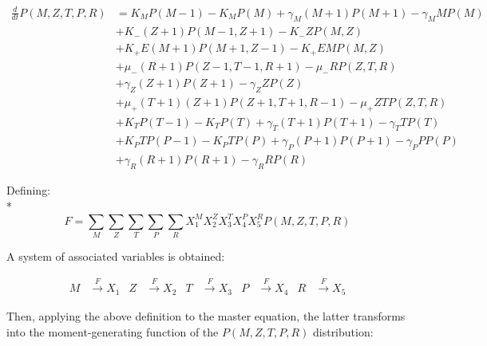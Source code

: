 \documentclass{article}
\begin{document}
\begin{align*}
    \frac{d}{dt}P(M, Z, T, P, R) &= K_MP(M-1) - K_MP(M) + \gamma_M(M+1)P(M+1) - \gamma_MMP(M)\\
                                 &+ K_-(Z+1)P(M-1,Z+1) - K_-ZP(M,Z)\\
                                 &+ K_+E(M+1)P(M+1,Z-1) - K_+EMP(M,Z)\\
                                 &+ \mu_-(R+1)P(Z-1,T-1,R+1) - \mu_-RP(Z,T,R)\\
                                 &+ \gamma_Z(Z+1)P(Z+1) - \gamma_ZZP(Z)\\
                                 &+ \mu_+(T+1)(Z+1)P(Z+1,T+1,R-1) - \mu_+ZTP(Z,T,R)\\
                                 &+ K_TP(T-1) - K_TP(T) + \gamma_T(T+1)P(T+1) - \gamma_TTP(T)\\
                                 &+ K_PTP(P-1) - K_PTP(P) + \gamma_P(P+1)P(P+1) - \gamma_PPP(P)\\
                                 &+ \gamma_R(R+1)P(R+1) - \gamma_RRP(R)
\end{align*}

Defining:
\\*
\begin{equation*}
    F = \sum_M\sum_Z\sum_T\sum_P\sum_R X_1^MX_2^ZX_3^TX_4^PX_5^RP(M,Z,T,P,R)
\end{equation*}


A system of associated variables is obtained:

\begin{align*}
    M &\xrightarrow{F} X_1 & Z&\xrightarrow{F} X_2 & T & \xrightarrow{F} X_3  &  P &\xrightarrow{F} X_4  &  R &\xrightarrow{F} X_5
\end{align*}

Then, applying the above definition to the master equation, the latter transforms into the moment-generating function of the $P(M,Z,T,P,R)$ distribution: 
\end{document}
